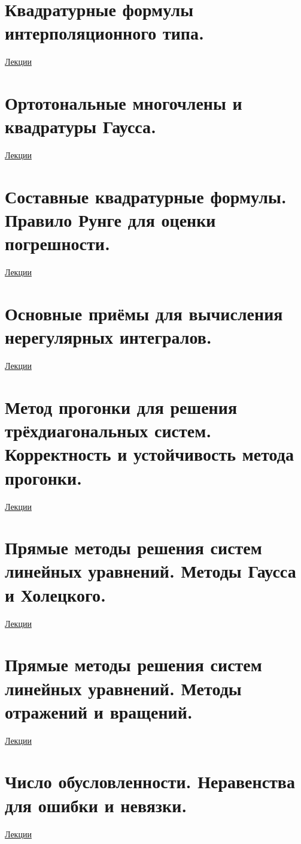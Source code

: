 \documentclass[specialist, subf, href, colorlinks=true, 12pt, times, mtpro, final]{disser}
\theoremstyle{definition}
\begin{document}
\section {Квадратурные формулы интерполяционного типа.}
	\hyperlink {lects.37}{Лекции}\\

\section {Ортотональные многочлены и квадратуры Гаусса.}
	\hyperlink {lects.40}{Лекции}\\

\section {Составные квадратурные формулы. Правило Рунге для оценки погрешности.}
	\hyperlink {lects.44}{Лекции}\\

\section {Основные приёмы для вычисления нерегулярных интегралов.}
	\hyperlink {lects.45}{Лекции}\\

\section {Метод прогонки для решения трёхдиагональных систем. Корректность и устойчивость метода прогонки.}
	\hyperlink {lects.48}{Лекции}\\

\section {Прямые методы решения систем линейных уравнений. Методы Гаусса и Холецкого.}
	\hyperlink {lects.51}{Лекции}\\

\section {Прямые методы решения систем линейных уравнений. Методы отражений и вращений.}
	\hyperlink {lects.54}{Лекции}\\

\section {Число обусловленности. Неравенства для ошибки и невязки.}
	\hyperlink {lects.56}{Лекции}\\
\end{document}
